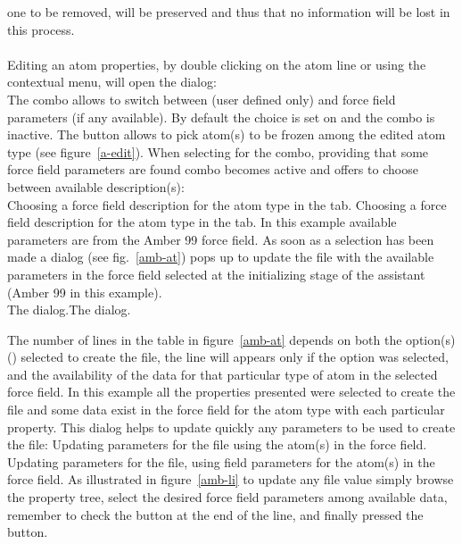 one to be removed, will be preserved and thus that no information will be lost in this process. \\
\\
Editing an atom properties, by double clicking on the atom line or using the contextual menu, will open the  dialog: \\
\laf The  combo allows to switch between  (user defined only) and  force field parameters (if any available). 
By default the choice is set on  and the  combo is inactive. 
The  button allows to pick atom(s) to be frozen among the edited atom type (see figure~\ref{a-edit}). 
\clearpage
\noindent When selecting  for the  combo, providing that some force field parameters are found  combo becomes active 
and offers to choose between available description(s): \\
{Choosing a force field description for the atom type in the  tab.}
{Choosing a force field description for the atom type in the  tab. In this example available parameters are from the Amber 99 force field.}
\laf As soon as a selection has been made a dialog (see fig.~\ref{amb-at}) pops up to update the  file with the available parameters in the force field selected
at the initializing stage of the assistant (Amber 99 in this example). \\
{}
{The  dialog.}{The  dialog.}

\clearpage
\noindent The number of lines in the table in figure~\ref{amb-at} depends on both the option(s) () selected to create the  file, 
the line will appears only if the option was selected, and the availability of the data for that particular type of atom in the selected force field. 
In this example all the properties presented were selected to create the  file and some data exist in the force field for the  atom type with each particular property. 
\noindent This dialog helps to update quickly any parameters to be used to create the  file: 
{Updating parameters for the  file using the  atom(s) in the  force field.}
{Updating parameters for the  file, using field parameters for the  atom(s) in the  force field.}
\laf As illustrated in figure~\ref{amb-li} to update any  file value simply browse the property tree, select the desired force field parameters among available data, 
remember to check the  button at the end of the line, and finally pressed the  button.

